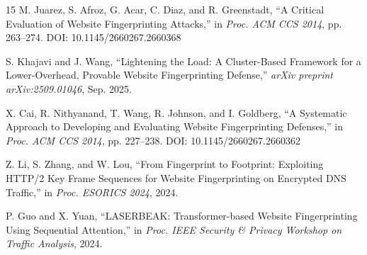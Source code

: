 \documentclass[conference]{IEEEtran}
\begin{document}
\begin{thebibliography}{15}
M. Juarez, S. Afroz, G. Acar, C. Diaz, and R. Greenstadt, ``A Critical Evaluation of Website Fingerprinting Attacks,'' in \emph{Proc. ACM CCS 2014}, pp. 263--274. DOI: 10.1145/2660267.2660368

S. Khajavi and J. Wang, ``Lightening the Load: A Cluster-Based Framework for a Lower-Overhead, Provable Website Fingerprinting Defense,'' \emph{arXiv preprint arXiv:2509.01046}, Sep. 2025.

X. Cai, R. Nithyanand, T. Wang, R. Johnson, and I. Goldberg, ``A Systematic Approach to Developing and Evaluating Website Fingerprinting Defenses,'' in \emph{Proc. ACM CCS 2014}, pp. 227--238. DOI: 10.1145/2660267.2660362

Z. Li, S. Zhang, and W. Lou, ``From Fingerprint to Footprint: Exploiting HTTP/2 Key Frame Sequences for Website Fingerprinting on Encrypted DNS Traffic,'' in \emph{Proc. ESORICS 2024}, 2024.

P. Guo and X. Yuan, ``LASERBEAK: Transformer-based Website Fingerprinting Using Sequential Attention,'' in \emph{Proc. IEEE Security \& Privacy Workshop on Traffic Analysis}, 2024.

\end{thebibliography}
\end{document}
